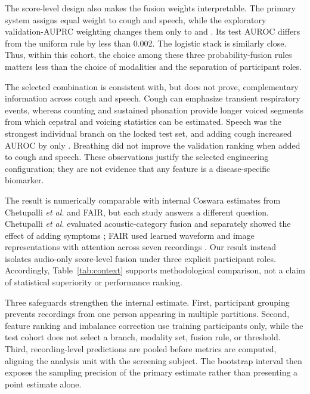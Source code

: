 \documentclass[conference]{IEEEtran}
\begin{document}
The score-level design also makes the fusion weights interpretable. The primary
system assigns equal weight to cough and speech, while the exploratory
validation-AUPRC weighting changes them only to \CoughFusionWeight{} and
\SpeechFusionWeight{}. Its test AUROC differs from the uniform rule by less
than 0.002. The logistic stack is similarly close. Thus, within this cohort,
the choice among these three probability-fusion rules matters less than the
choice of modalities and the separation of participant roles.

The selected combination is consistent with, but does not prove, complementary
information across cough and speech. Cough can emphasize transient respiratory
events, whereas counting and sustained phonation provide longer voiced segments
from which cepstral and voicing statistics can be estimated. Speech was the
strongest individual branch on the locked test set, and adding cough increased
AUROC by only \FusionMinusSpeechAUROC{}. Breathing did not improve the
validation ranking when added to cough and speech. These observations justify
the selected engineering configuration; they are not evidence that any feature
is a disease-specific biomarker.

The result is numerically comparable with internal Coswara estimates from
Chetupalli \emph{et al.} and FAIR, but each study answers a different question.
Chetupalli \emph{et al.} evaluated acoustic-category fusion and separately
showed the effect of adding symptoms \cite{chetupalli2023multimodal}; FAIR used
learned waveform and image representations with attention across seven
recordings \cite{truong2024fair}. Our result instead isolates audio-only
score-level fusion under three explicit participant roles. Accordingly,
Table~\ref{tab:context} supports methodological comparison, not a claim of
statistical superiority or performance ranking.

Three safeguards strengthen the internal estimate. First, participant grouping
prevents recordings from one person appearing in multiple partitions. Second,
feature ranking and imbalance correction use training participants only, while
the test cohort does not select a branch, modality set, fusion rule, or
threshold. Third, recording-level predictions are pooled before metrics are
computed, aligning the analysis unit with the screening subject. The bootstrap
interval then exposes the sampling precision of the primary estimate rather
than presenting a point estimate alone.
\end{document}
